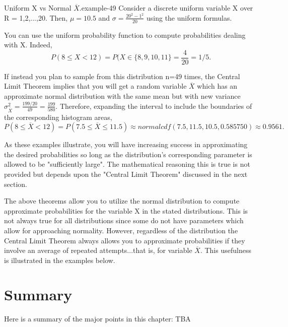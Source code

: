 \documentclass[10pt,]{book}
\numberwithin{equation}{section}
\newcommand{\lt}{<}
\begin{document}
\begin{example}{Uniform X vs Normal \(\overline{X}\).}{example-49}%
\hypertarget{p-1238}{}%
Consider a discrete uniform variable X over R = {1,2,...,20}.  Then, \(\mu = 10.5\) and \(\sigma = \frac{20^2-1^2}{20}\) using the uniform formulas.%
\par
\hypertarget{p-1239}{}%
You can use the uniform probability function to compute probabilities dealing with X. Indeed,%
\begin{equation*}
P(8 \le X \lt 12) = P(X \in \{8,9,10,11 \} = \frac{4}{20} = 1/5.
\end{equation*}
%
\par
\hypertarget{p-1240}{}%
If instead you plan to sample from this distribution n=49 times, the Central Limit Theorem implies that you will get a random variable \(\overline{X}\) which has an approximate normal distribution with the same mean but with new variance \(\sigma_{\overline{X}}^2 = \frac{199/20}{49} = \frac{199}{580}\).  Therefore, expanding the interval to include the boundaries of the corresponding histogram areas,%
\begin{equation*}
P( 8 \le \overline{X} \lt 12 ) = P(7.5 \le \overline{X} \le 11.5) \approx normalcdf(7.5,11.5,10.5,0.585750) \approx 0.9561 .
\end{equation*}
%
\end{example}
\hypertarget{p-1241}{}%
As these examples illustrate, you will have increasing success in approximating the desired probabilities so long as the distribution's corresponding parameter is allowed to be "sufficiently large". The mathematical reasoning this is true is not provided but depends upon the "Central Limit Theorem" discussed in the next section.%
\par
\hypertarget{p-1242}{}%
The above theorems allow you to utilize the normal distribution to compute approximate probabilities for the variable X in the stated distributions. This is not always true for all distributions since some do not have parameters which allow for approaching normality. However, regardless of the distribution the Central Limit Theorem always allows you to approximate probabilities if they involve an average of repeated attempts...that is, for variable \(\overline{X}\). This usefulness is illustrated in the examples below.%
%
%
\typeout{************************************************}
\typeout{************************************************}
%
\section[{Summary}]{Summary}\label{section-63}
\hypertarget{p-1243}{}%
Here is a summary of the major points in this chapter:%
\hypertarget{p-1244}{}%
TBA%
%
%
\typeout{************************************************}
\typeout{************************************************}
%
\end{document}
